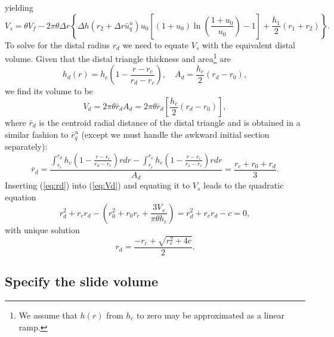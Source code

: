 yielding
\begin{equation}
V_s = \theta V_f - 2 \pi \theta \Delta r \left \{ \Delta h \left ( r_2 + \Delta r\bar{u}_q^u \right ) u_0 \left [ (1 + u_0) \ln \left (\frac{1 + u_0}{u_0} \right ) - 1 \right ] + \frac{h_1}{2} (r_1 + r_2) \right \}.
\label{eq:Vs}
\end{equation}
To solve for the distal radius $r_d$ we need to equate $V_s$ with the equivalent distal volume.
Given that the distal triangle thickness and area\footnote{We assume that $h(r)$ from $h_c$ to zero may be approximated
as a linear ramp.} are
\begin{equation*}
h_d(r) = h_c \left (1 - \frac{r - r_c}{r_d - r_c}\right ), \quad A_d = \frac{h_c}{2} (r_d - r_0),
\end{equation*}
we find its volume to be
\begin{equation}
V_d = 2 \pi \theta \bar{r}_d A_d = 2 \pi \theta \bar{r}_d \left [ \frac{h_c}{2} (r_d - r_0) \right ],
\label{eq:Vd}
\end{equation}
where $\bar{r}_d$ is the centroid radial distance of the distal triangle and is obtained in a similar fashion to $\bar{r}_q^u$
(except we must handle the awkward initial section separately):
\begin{equation}
\bar{r}_d = \frac{\int_{r_c}^{r_d}h_c \left (1 - \frac{r - r_c}{r_d - r_c} \right )rdr - \int_{r_c}^{r_o}h_c \left (1 - \frac{r - r_c}{r_o- r_c} \right )rdr}{A_d} = \frac{r_c + r_0 + r_d}{3}.
\label{eq:rd}
\end{equation}
Inserting (\ref{eq:rd}) into (\ref{eq:Vd}) and equating it to $V_s$ leads to the quadratic equation
\begin{equation*}
r_d^2 + r_c r_d - \left (r_0^2 + r_0 r_c + \frac{3 V_s}{\pi \theta h_c}\right ) = r_d^2 + r_c r_d - c = 0,
\end{equation*}
with unique solution
\begin{equation}
r_d = \frac{-r_c + \sqrt{r_c^2 + 4c}}{2}.
\end{equation}

\subsection{Specify the slide volume}

